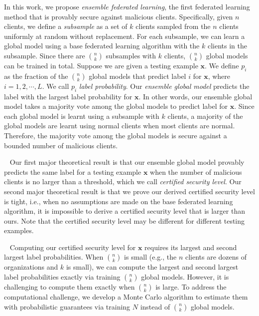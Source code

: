 \documentclass[letterpaper]{article} %
\newcommand{\myparatight}[1]{\smallskip\noindent{\bf {#1}:}~}
\begin{document}
In this work, we propose \emph{ensemble federated learning}, the first federated learning method that is provably secure against malicious clients. Specifically, given $n$ clients, we define a \emph{subsample} as a set of $k$ clients sampled from the $n$ clients uniformly at random without replacement. For each subsample, we can learn a global model using a base federated learning algorithm with the $k$ clients in the subsample. Since there are ${n \choose k}$ subsamples with $k$ clients, ${n \choose k}$ global models can be trained in total. Suppose we are given a testing example $\mathbf{x}$. We define $p_i$ as the fraction of the ${n \choose k}$ global models that predict label $i$ for $\mathbf{x}$, where $i=1,2,\cdots,L$. We call $p_i$ \emph{label probability}. Our \emph{ensemble global model} predicts the label with the largest label probability for $\mathbf{x}$. In other words, our ensemble global model takes a majority vote among the global models to predict label for $\mathbf{x}$. Since each global model is learnt using a subsample with $k$ clients, a majority of the global models are learnt using normal clients when most clients are normal. Therefore, the majority vote among the global models is secure against a bounded number of malicious clients.

\myparatight{Theory} Our first major theoretical result is that our ensemble global model provably predicts the same label for a testing example $\mathbf{x}$ when the number of malicious clients is no larger than a threshold, which we call \emph{certified security level}.  Our second major theoretical result is that we prove our derived certified security level is tight, i.e., when no assumptions are made on the base federated learning algorithm, it is impossible to derive a certified security level that is larger than ours. Note that the certified security level may be different for different testing examples. 

\myparatight{Algorithm} Computing our certified security level for $\mathbf{x}$ requires its largest and second largest label probabilities. When ${n \choose k}$ is small (e.g., the $n$ clients are dozens of organizations \cite{kairouz2019advances} and $k$ is small), we can compute the largest and second largest label probabilities exactly via training ${n \choose k}$ global models. 
However, it is challenging to compute them exactly when ${n \choose k}$ is large. To address the computational challenge, we develop a Monte Carlo algorithm to estimate them with probabilistic guarantees via training $N$ instead of ${n \choose k}$ global models.  
\end{document}
